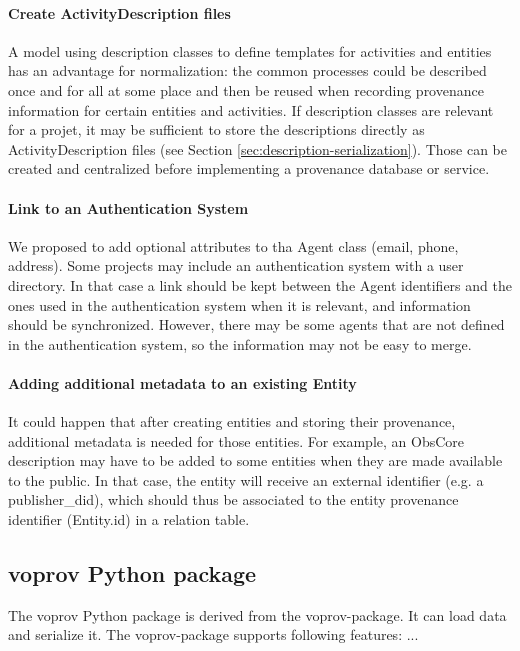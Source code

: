 \paragraph{Create ActivityDescription files}
A model using description classes to define templates for activities and
entities has an advantage for normalization: the common processes could be
described once and for all at some place and then be reused when recording
provenance information for certain entities and activities.
If description classes are relevant for a projet, it may be sufficient to store the descriptions directly as ActivityDescription files (see Section \ref{sec:description-serialization}). 
Those can be created and centralized before implementing a provenance database or service.

\paragraph{Link to an Authentication System}
We proposed to add optional attributes to tha Agent class (email, phone, address). Some projects may include an authentication system with a user directory. In that case a link should be kept between the Agent identifiers and the ones used in the authentication system when it is relevant, and information should be synchronized. However, there may be some agents that are not defined in the authentication system, so the information may not be easy to merge.

\paragraph{Adding additional metadata to an existing Entity}
It could happen that after creating entities and storing their provenance, additional metadata is needed for those entities. For example, an ObsCore description may have to be added to some entities when they are made available to the public. In that case, the entity will receive an external identifier (e.g. a publisher\_did), which should thus be associated to the entity provenance identifier (Entity.id) in a relation table.


\subsection{voprov Python package}\label{sec:implementation_voprov}
The voprov Python package is derived from the voprov-package. It can load
data and serialize it. The voprov-package supports following features:
...

